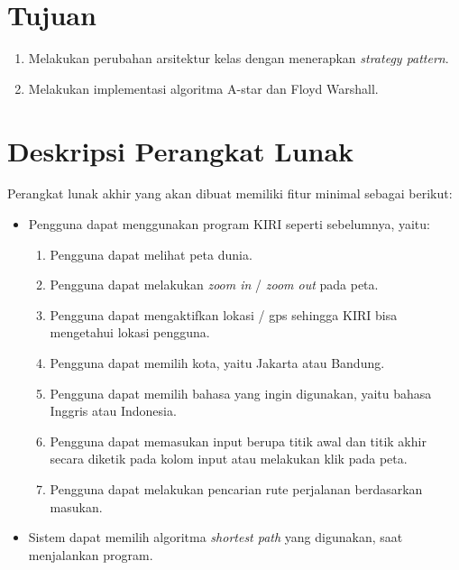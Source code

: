 \documentclass[a4paper,twoside]{article}
\begin{document}
	\section{Tujuan}
            \begin{enumerate}
                \item Melakukan perubahan arsitektur kelas dengan menerapkan \textit{strategy pattern}.
                \item Melakukan implementasi algoritma A-star dan Floyd Warshall.
            \end{enumerate}
	
	\section{Deskripsi Perangkat Lunak}
	Perangkat lunak akhir yang akan dibuat memiliki fitur minimal sebagai berikut:
    	\begin{itemize}
                \item Pengguna dapat menggunakan program KIRI seperti sebelumnya, yaitu:
                \begin{enumerate}
                    \item Pengguna dapat melihat peta dunia.
    		      \item Pengguna dapat melakukan \textit{zoom in} / \textit{zoom out} pada peta.
    		      \item Pengguna dapat mengaktifkan lokasi / gps sehingga KIRI bisa mengetahui lokasi pengguna.
    		      \item Pengguna dapat memilih kota, yaitu Jakarta atau Bandung.
    		      \item Pengguna dapat memilih bahasa yang ingin digunakan, yaitu bahasa Inggris atau Indonesia. 
    		      \item Pengguna dapat memasukan input berupa titik awal dan titik akhir secara diketik pada kolom input atau melakukan klik pada peta.
                        \item Pengguna dapat melakukan pencarian rute perjalanan berdasarkan masukan.
                \end{enumerate}
                \item Sistem dapat memilih algoritma \textit{shortest path} yang digunakan, saat menjalankan program.
    	\end{itemize}
	
\end{document}
